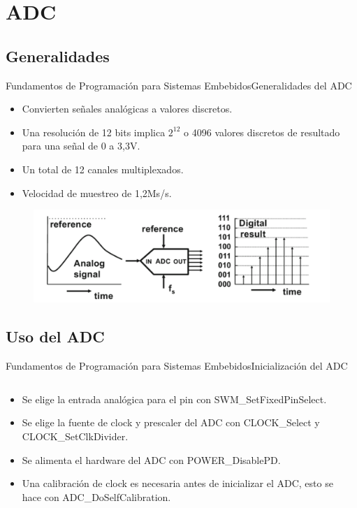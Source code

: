 \documentclass[aspectratio=169, xcolor=dvipsnames]{beamer}
\begin{document}
\section{ADC}
\subsection{Generalidades}
\begin{frame}{Fundamentos de Programación para Sistemas Embebidos}{Generalidades del ADC}
\begin{itemize}
    \item Convierten señales analógicas a valores discretos.
    \item Una resolución de 12 bits implica $2^{12}$ o 4096 valores discretos de resultado para una señal de 0 a 3,3V.
    \item Un total de 12 canales multiplexados.
    \item Velocidad de muestreo de 1,2Ms/s.
\end{itemize}
\begin{figure}
\centering
\includegraphics[width=0.75\linewidth]{resources/images/adc.png}
\end{figure}
\end{frame}

\subsection{Uso del ADC}
\begin{frame}{Fundamentos de Programación para Sistemas Embebidos}{Inicialización del ADC}
\begin{columns}
\begin{column}{0.5\textwidth}
\begin{itemize}
    \item Se elige la entrada analógica para el pin con \textcolor{myblue}{SWM\_SetFixedPinSelect}.
    \item Se elige la fuente de clock y prescaler del ADC con \textcolor{myblue}{CLOCK\_Select} y \textcolor{myblue}{CLOCK\_SetClkDivider}.
    \item Se alimenta el hardware del ADC con \textcolor{myblue}{POWER\_DisablePD}.
    \item Una calibración de clock es necesaria antes de inicializar el ADC, esto se hace con \textcolor{myblue}{ADC\_DoSelfCalibration}.
\end{itemize}
\end{column}
\begin{column}{0.5\textwidth}

\end{column}
\end{columns}
\end{frame}
\end{document}
